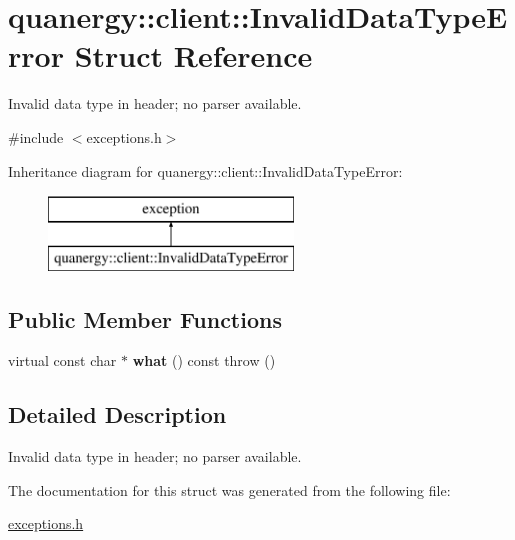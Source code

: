 \hypertarget{structquanergy_1_1client_1_1InvalidDataTypeError}{\section{quanergy\-:\-:client\-:\-:Invalid\-Data\-Type\-Error Struct Reference}
\label{structquanergy_1_1client_1_1InvalidDataTypeError}
}


Invalid data type in header; no parser available.  




{\ttfamily \#include $<$exceptions.\-h$>$}

Inheritance diagram for quanergy\-:\-:client\-:\-:Invalid\-Data\-Type\-Error\-:\begin{figure}[H]
\begin{center}
\leavevmode
\includegraphics[height=2.000000cm]{structquanergy_1_1client_1_1InvalidDataTypeError}
\end{center}
\end{figure}
\subsection*{Public Member Functions}
\begin{DoxyCompactItemize}
\item 
\hypertarget{structquanergy_1_1client_1_1InvalidDataTypeError_ac0933a83bd02c949f584543a8729a4ac}{virtual const char $\ast$ {\bfseries what} () const   throw ()}\label{structquanergy_1_1client_1_1InvalidDataTypeError_ac0933a83bd02c949f584543a8729a4ac}

\end{DoxyCompactItemize}


\subsection{Detailed Description}
Invalid data type in header; no parser available. 

The documentation for this struct was generated from the following file\-:\begin{DoxyCompactItemize}
\item 
\hyperlink{exceptions_8h}{exceptions.\-h}\end{DoxyCompactItemize}
